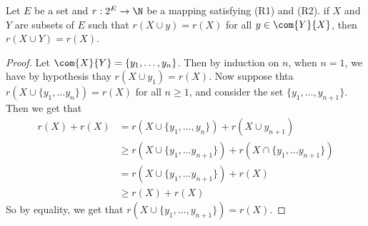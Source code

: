 \begin{lemma}\label{1.3.2}
    Let $E$ be a set and  $r:2^E \rightarrow \N$ be a mapping satisfying (R1)
    and (R2). if $X$ and  $Y$ are subsets of  $E$ such that  $r(X \cup y)=r(X)$
    for all $y \in \com{Y}{X}$, then $r(X \cup Y)=r(X)$.
\end{lemma}
\begin{proof}
    Let $\com{X}{Y}=\{y_1, \dots, y_n\}$. Then by induction on $n$, when  $n=1$,
    we have by hypothesis thay  $r(X \cup y_1)=r(X)$. Now suppose thta $r(X \cup
    \{y_1, \dots y_n\})=r(X)$ for all $n \geq 1$, and consider the set
    $\{y_1,\dots,y_{n+1}\}$. Then we get that
    \begin{align*}
        r(X)+r(X)   &=  r(X \cup \{y_1, \dots, y_n\})+r(X \cup y_{n+1}) \\
                    & \geq r(X \cup \{y_1, \dots y_{n+1}\})+r(X \cap \{y_1,
                        \dots y_{n+1}\}) \\
                    &= r(X \cup \{y_1, \dots y_{n+1}\})+r(X) \\
                    & \geq r(X)+r(X)
    \end{align*}
    So by equality, we get that $r(X \cup \{y_1, \dots, y_{n+1}\})=r(X)$.
\end{proof}

